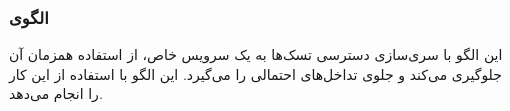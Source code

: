 \subsubsection{الگوی }
\label{scheduleGuardedCallSec}
\begin{RTL}
این الگو با سری‌سازی دسترسی تسک‌ها به یک سرویس خاص، از استفاده همزمان آن
جلوگیری می‌کند و جلوی تداخل‌های احتمالی را می‌گیرد. این الگو با استفاده از
 این کار را انجام می‌دهد.
\end{RTL}